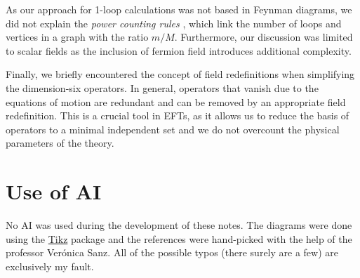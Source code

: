 \documentclass[11pt]{article}
\begin{document}
As our approach for 1-loop calculations was not based in Feynman diagrams, we did not explain the \textit{power counting rules} \cite{Burgess_2007}, which link the number of loops and vertices in a graph with the ratio $m/M$. Furthermore, our discussion was limited to scalar fields as the inclusion of fermion field introduces additional complexity. 

Finally, we briefly encountered the concept of field redefinitions when simplifying the dimension-six operators. In general, operators that vanish due to the equations of motion are redundant and can be removed by an appropriate field redefinition. This is a crucial tool in EFTs, as it allows us to reduce the basis of operators to a minimal independent set and we do not overcount the physical parameters of the theory.
\section*{Use of AI}
No AI was used during the development of these notes. The diagrams were done using the \href{https://tikz.net/}{Tikz} package and the references were hand-picked with the help of the professor Verónica Sanz. All of the possible typos (there surely are a few) are exclusively my fault.

\appendix

\newpage

\printbibliography
\end{document}
